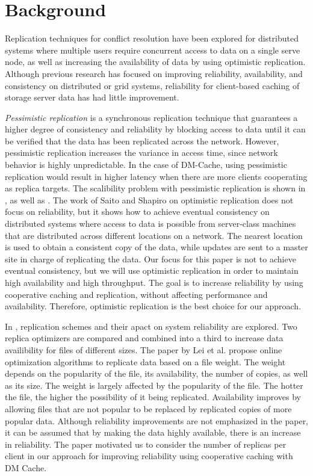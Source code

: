 \section{Background}

Replication techniques for conflict resolution have been explored for distributed systems where multiple users require concurrent access to data on a single serve node, as well as increasing the availability of data by using optimistic replication\cite{Replication}.  Although previous research has focused on improving reliability, availability, and consistency on distributed or grid systems, reliability for client-based caching of storage server data has had little improvement.

\textit{Pessimistic replication} is a synchronous replication technique that guarantees a higher degree of consistency and reliability by blocking access to data until it can be verified that the data has been replicated across the network. However, pessimistic replication increases the variance in access time, since network behavior is highly unpredictable. In the case of DM-Cache, using pessimistic replication would result in higher latency when there are more clients cooperating as replica targets. The scalibility problem with pessimistic replication is shown in \cite{Replicated-Services}, as well as \cite{Replication-Cost}. The work of Saito and Shapiro on optimistic replication\cite{Replication} does not focus on reliability, but it shows how to achieve eventual consistency on distributed systems where access to data is possible from server-class machines that are distributed across different locations on a network. The nearest location is used to obtain a consistent copy of the data, while updates are sent to a master site in charge of replicating the data. Our focus for this paper is not to achieve eventual consistency, but we will use optimistic replication in order to maintain high availability and high throughput. The goal is to increase reliability by using cooperative caching and replication, without affecting performance and availability. Therefore, optimistic replication is the best choice for our approach.

In \cite{Online-Grid}, replication schemes and their apact on system reliability are explored. Two replica optimizers are compared and combined into a third to increase data availibility for files of different sizes. The paper by Lei et al. propose online optimization algorithms to replicate data based on a file weight. The weight depends on the popularity of the file, its availability, the number of copies, as well as its size. The weight is largely affected by the popularity of the file. The hotter the file, the higher the possibility of it being replicated. Availability improves by allowing files that are not popular to be replaced by replicated copies of more popular data. Although reliability improvements are not emphasized in the paper, it can be assumed that by making the data highly available, there is an increase in reliability. The paper motivated us to consider the number of replicas per client in our approach for improving reliability using cooperative caching with DM Cache.

\label{background}
